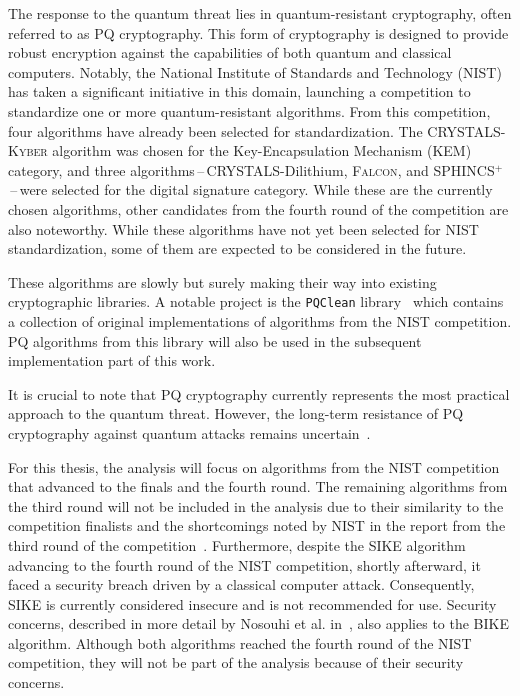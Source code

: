 The response to the quantum threat lies in quantum-resistant cryptography, often referred to as PQ cryptography. This form of cryptography is designed to provide robust encryption against the capabilities of both quantum and classical computers. Notably, the National Institute of Standards and Technology (NIST) has taken a significant initiative in this domain, launching a competition to standardize one or more quantum-resistant algorithms. From this competition, four algorithms have already been selected for standardization. The \textsc{CRYSTALS-Kyber} algorithm was chosen for the Key-Encapsulation Mechanism (KEM) category, and three algorithms\,--\,CRYSTALS-Dilithium, \textsc{Falcon}, and SPHINCS$^+$\,--\,were selected for the digital signature category. While these are the currently chosen algorithms, other candidates from the fourth round of the competition are also noteworthy. While these algorithms have not yet been selected for NIST standardization, some of them are expected to be considered in the future. 

These algorithms are slowly but surely making their way into existing cryptographic libraries. A notable project is the \texttt{PQClean} library~\cite{PQClean.git, PQClean.article} which contains a collection of original implementations of algorithms from the NIST competition. PQ algorithms from this library will also be used in the subsequent implementation part of this work.

It is crucial to note that PQ cryptography currently represents the most practical approach to the quantum threat. However, the long-term resistance of PQ cryptography against quantum attacks remains uncertain~\cite{pq.blockchain.survey.10288193}.

For this thesis, the analysis will focus on algorithms from the NIST competition that advanced to the finals and the fourth round. The remaining algorithms from the third round will not be included in the analysis due to their similarity to the competition finalists and the shortcomings noted by NIST in the report from the third round of the competition~\cite{NIST.round3.report}. Furthermore, despite the SIKE algorithm advancing to the fourth round of the NIST competition, shortly afterward, it faced a security breach driven by a classical computer attack. Consequently, SIKE is currently considered insecure and is not recommended for use. Security concerns, described in more detail by Nosouhi et al. in~\cite{pq.BFKE}, also applies to the BIKE algorithm. Although both algorithms reached the fourth round of the NIST competition, they will not be part of the analysis because of their security concerns.

